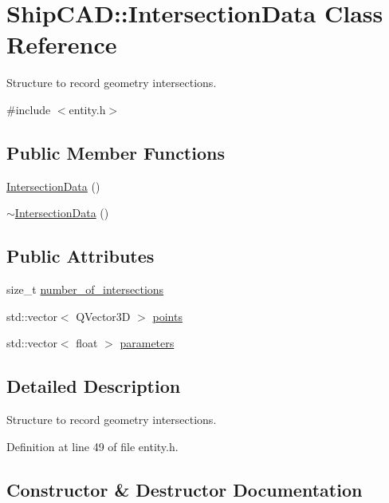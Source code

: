 \hypertarget{classShipCAD_1_1IntersectionData}{}\section{Ship\+C\+AD\+:\+:Intersection\+Data Class Reference}
\label{classShipCAD_1_1IntersectionData}


Structure to record geometry intersections.  




{\ttfamily \#include $<$entity.\+h$>$}

\subsection*{Public Member Functions}
\begin{DoxyCompactItemize}
\item 
\hyperlink{classShipCAD_1_1IntersectionData_acc582d8820d6e60117e0bf5fe686ab76}{Intersection\+Data} ()
\item 
\hyperlink{classShipCAD_1_1IntersectionData_a80ee22151368715711e3713eae61d401}{$\sim$\+Intersection\+Data} ()
\end{DoxyCompactItemize}
\subsection*{Public Attributes}
\begin{DoxyCompactItemize}
\item 
size\+\_\+t \hyperlink{classShipCAD_1_1IntersectionData_a5b42e3b8b81d18963f9a07609b402628}{number\+\_\+of\+\_\+intersections}
\item 
std\+::vector$<$ Q\+Vector3D $>$ \hyperlink{classShipCAD_1_1IntersectionData_a926e126e42d95e01b39e2750a0e1fb95}{points}
\item 
std\+::vector$<$ float $>$ \hyperlink{classShipCAD_1_1IntersectionData_a06fcbb71243644bdea0e5b86da3b191c}{parameters}
\end{DoxyCompactItemize}


\subsection{Detailed Description}
Structure to record geometry intersections. 

Definition at line 49 of file entity.\+h.



\subsection{Constructor \& Destructor Documentation}
